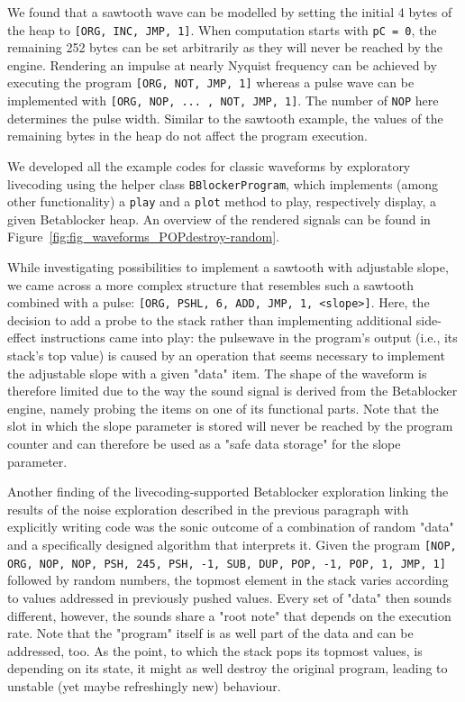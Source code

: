 \documentclass[letterpaper, 12pt]{article}
\begin{document}
We found that a sawtooth wave can be modelled by setting the initial 4 bytes of the heap to
\texttt{[ORG, INC, JMP, 1]}.
When computation starts with \texttt{pC = 0}, the remaining 252 bytes can be set arbitrarily as they will never be reached by the engine.
Rendering an impulse at nearly Nyquist frequency can be achieved by executing the program \texttt{[ORG, NOT, JMP, 1]} whereas a pulse wave can be implemented with \texttt{[ORG, NOP, ... , NOT, JMP, 1]}.
The number of \texttt{NOP} here determines the pulse width.
Similar to the sawtooth example, the values of the remaining bytes in the heap do not affect the program execution.

We developed all the example codes for classic waveforms by exploratory livecoding using the helper class \texttt{BBlockerProgram}, which implements (among other functionality) a \texttt{play} and a \texttt{plot} method to play, respectively display, a given Betablocker heap.
An overview of the rendered signals can be found in Figure~\ref{fig:fig_waveforms_POPdestroy-random}.


While investigating possibilities to implement a sawtooth with adjustable slope, we came across a more complex structure that resembles such a sawtooth combined with a pulse: \texttt{[ORG, PSHL, 6, ADD, JMP, 1, <slope>]}. 
Here, the decision to add a probe to the stack rather than implementing additional side-effect instructions came into play: the pulsewave in the program's output (i.e., its stack's top value) is caused by an operation that seems necessary to implement the adjustable slope with a given "data" item.
The shape of the waveform is therefore limited due to the way the sound signal is derived from the Betablocker engine, namely probing the items on one of its functional parts.
Note that the slot in which the slope parameter is stored will never be reached by the program counter and can therefore be used as a "safe data storage" for the slope parameter.


Another finding of the livecoding-supported Betablocker exploration linking the results of the noise exploration described in the previous paragraph with explicitly writing code
was the sonic outcome of a combination of random "data" and a specifically designed algorithm that interprets it.
Given the program
\texttt{[NOP, ORG, NOP, NOP, PSH, 245, PSH, -1, SUB, DUP, POP, -1, POP, 1, JMP, 1]} 
followed by random numbers, the topmost element in the stack varies according to values addressed in previously pushed values.
Every set of "data" then sounds different, however, the sounds share a "root note" that depends on the execution rate.
Note that the "program" itself is as well part of the data and can be addressed, too.
As the point, to which the stack pops its topmost values, is depending on its state, it might as well destroy the original program, leading to unstable (yet maybe refreshingly new) behaviour.
\end{document}
